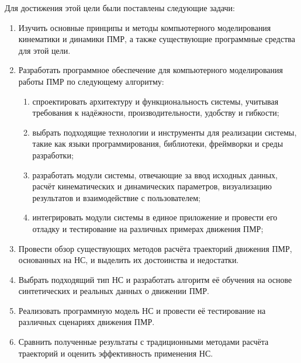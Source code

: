 Для достижения этой цели были поставлены следующие задачи:
\begin{enumerate}
\item Изучить основные принципы и методы компьютерного моделирования кинематики и динамики ПМР, а также существующие программные средства для этой цели.
\item Разработать программное обеспечение для компьютерного моделирования работы ПМР по следующему алгоритму:
    \begin{enumerate}[label=\asbuk*)]
    \item спроектировать архитектуру и функциональность системы, учитывая требования к надёжности, производительности, удобству и гибкости;
    \item выбрать подходящие технологии и инструменты для реализации системы, такие как языки программирования, библиотеки, фреймворки и среды разработки;
    \item разработать модули системы, отвечающие за ввод исходных данных, расчёт кинематических и динамических параметров, визуализацию результатов и взаимодействие с пользователем;
    \item интегрировать модули системы в единое приложение и провести его отладку и тестирование на различных примерах движения ПМР;
\end{enumerate}
\item Провести обзор существующих методов расчёта траекторий движения ПМР, основанных на НС, и выделить их достоинства и недостатки.
\item Выбрать подходящий тип НС и разработать алгоритм её обучения на основе синтетических и реальных данных о движении ПМР.
\item Реализовать программную модель НС и провести её тестирование на различных сценариях движения ПМР.
\item Сравнить полученные результаты с традиционными методами расчёта траекторий и оценить эффективность применения НС.
\end{enumerate}